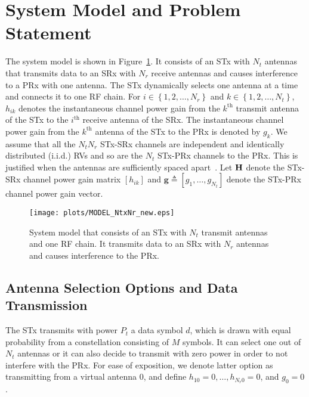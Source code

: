 \documentclass[12pt,draftcls,peerreview,onecolumn]{IEEEtran}
\newcommand{\define}{\triangleq}
\newcommand{\mtx}[1]{{\bf #1}} %
\newcommand{\nx}{{0}}
\newcommand{\Nt}{{N_t}}
\newcommand{\Nr}{{N_r}}
\newcommand{\Pt}{{P_t}}
\newcommand{\such}{h}
\newcommand{\puch}{g}
\newcommand{\hk}[1]{{\such_{#1}}}
\newcommand{\gk}[1]{{\puch_{#1}}}
\newcommand{\g}{\mathbf{\puch}}
\newcommand{\antopts}{\left\{1,2,\ldots,\Nt\right\}}
\newcommand{\nropts}{\left\{1,2,\ldots,\Nr\right\}}
\newcommand{\Hmx}{\mtx{H}}
\newcommand{\ith}{i^{\text{th}}}
\newcommand{\kth}{k^{\text{th}}}
\begin{document}
\section{System Model and Problem Statement}
\label{sec:model}
The system model is shown in Figure~\ref{fig:MODEL}. It consists of an STx with $\Nt$ antennas that transmits data to an SRx with $\Nr$ receive antennas and causes interference to a PRx with one antenna. The STx dynamically selects one antenna at a time and connects it to one RF chain. For $i \in \nropts$ and $k \in \antopts$, $\hk{ik}$ denotes the instantaneous channel power gain from the $\kth$ transmit antenna of the STx to the $\ith$ receive antenna of the SRx. The instantaneous channel power gain from the $\kth$ antenna of the STx to the PRx is denoted by $\gk{k}$. We assume that all the $\Nt\Nr$ STx-SRx channels are independent and identically distributed (i.i.d.) RVs and so are the $\Nt$ STx-PRx channels to the PRx. This is justified when the antennas are sufficiently spaced apart~\cite{Fakhan_2014_TSP,Kong_2011_JCN,Sarvendranath_2013_TCOM,Hanif_2015_globecom}. Let $\Hmx$ denote the STx-SRx channel power gain matrix $\left[\hk{ik}\right]$ and $\g\define\left[\gk{1},\ldots,\gk{\Nt}\right]$ denote the STx-PRx channel power gain vector.

\begin{figure}
\centering 
\texttt{[image: plots/MODEL\_NtxNr\_new.eps]}
\caption{System model that consists of an STx with $\Nt$ transmit antennas and one RF chain. It transmits data to an SRx with $\Nr$ antennas and causes interference to the PRx.}
\label{fig:MODEL}
\end{figure}

\newcommand{\hs}{\mathbf{\such}_{s}}
\newcommand{\bhk}[1]{\mathbf{\such}_{#1}}
\newcommand{\hsstar}{\mathbf{\such}_{s^{*}}}
\newcommand{\datasymbol}{d}

\subsection{Antenna Selection Options and Data Transmission}
The STx transmits with power $\Pt$ a data symbol $\datasymbol$, which is drawn with equal probability from a constellation consisting of $M$ symbols. It can select one out of $\Nt$ antennas or it can also decide to transmit with zero power in order to not interfere with the PRx. For ease of exposition, we denote latter option as transmitting from a virtual antenna $\nx$, and define $\hk{1\nx} = 0,\ldots,\hk{\Nr\nx} = 0$, and $\gk{\nx}= 0$. 
\end{document}
